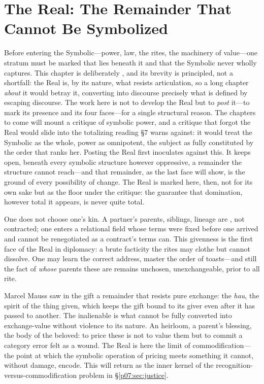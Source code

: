 \documentclass[11pt,a4paper]{article}
\newcommand{\emc}[1]{\textcolor{rose}{\oldtextit{#1}}}
\newcommand{\emb}[1]{\textcolor{rose}{\oldtextbf{#1}}}
\newcommand{\xref}[1]{\textcolor{rose}{\S\ref{#1}}}
\newcommand{\pinkref}[1]{\textcolor{rose}{#1}}
\begin{document}
\section{The Real: The Remainder That Cannot Be Symbolized}\label{p07:sec:real}

Before entering the Symbolic---power, law, the rites, the machinery of value---one stratum must be marked that lies beneath it and that the Symbolic never wholly captures. This chapter is deliberately \emb{short and sharp}, and its brevity is principled, not a shortfall: the Real is, by its nature, what resists articulation, so a long chapter \emph{about} it would betray it, converting into discourse precisely what is defined by escaping discourse. The work here is not to develop the Real but to \emph{post} it---to mark its presence and its four faces---for a single structural reason. The chapters to come will mount a critique of symbolic power, and a critique that forgot the Real would slide into the totalizing reading \pinkref{§7} warns against: it would treat the Symbolic as the whole, power as omnipotent, the subject as fully constituted by the order that ranks her. Posting the Real first inoculates against this. It keeps open, beneath every symbolic structure however oppressive, a remainder the structure cannot reach---and that remainder, as the last face will show, is the ground of every possibility of change. The Real is marked here, then, not for its own sake but as the floor under the critique: the guarantee that domination, however total it appears, is never quite total.

\emc{Givenness.} One does not choose one's kin. A partner's parents, siblings, lineage are \emb{given}, not contracted; one enters a relational field whose terms were fixed before one arrived and cannot be renegotiated as a contract's terms can. This givenness is the first face of the Real in diplomacy: a brute facticity the rites may clothe but cannot dissolve. One may learn the correct address, master the order of toasts---and still the fact of \emph{whose} parents these are remains unchosen, unexchangeable, prior to all rite.

\emc{Inalienability.} Marcel Mauss saw in the gift a remainder that resists pure exchange: the \emph{hau}, the spirit of the thing given, which keeps the gift bound to its giver even after it has passed to another. The inalienable is what cannot be fully converted into exchange-value without violence to its nature. An heirloom, a parent's blessing, the body of the beloved: to price these is not to value them but to commit a category error felt as a wound. The Real is here the limit of commodification---the point at which the symbolic operation of pricing meets something it cannot, without damage, encode. This will return as the inner kernel of the recognition-versus-commodification problem in \xref{p07:sec:justice}.
\end{document}
